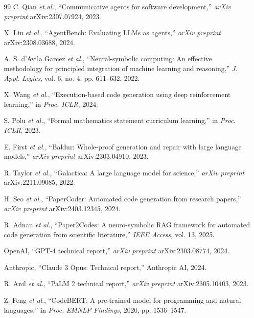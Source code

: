 \documentclass{ieeeaccess}
\begin{document}
\begin{thebibliography}{99}
C. Qian \emph{et al.}, ``Communicative agents for software development,'' \emph{arXiv preprint} arXiv:2307.07924, 2023.

X. Liu \emph{et al.}, ``AgentBench: Evaluating LLMs as agents,'' \emph{arXiv preprint} arXiv:2308.03688, 2024.

A. S. d'Avila Garcez \emph{et al.}, ``Neural-symbolic computing: An effective methodology for principled integration of machine learning and reasoning,'' \emph{J. Appl. Logics}, vol. 6, no. 4, pp. 611--632, 2022.

X. Wang \emph{et al.}, ``Execution-based code generation using deep reinforcement learning,'' in \emph{Proc. ICLR}, 2024.

S. Polu \emph{et al.}, ``Formal mathematics statement curriculum learning,'' in \emph{Proc. ICLR}, 2023.

E. First \emph{et al.}, ``Baldur: Whole-proof generation and repair with large language models,'' \emph{arXiv preprint} arXiv:2303.04910, 2023.

R. Taylor \emph{et al.}, ``Galactica: A large language model for science,'' \emph{arXiv preprint} arXiv:2211.09085, 2022.

H. Seo \emph{et al.}, ``PaperCoder: Automated code generation from research papers,'' \emph{arXiv preprint} arXiv:2403.12345, 2024.

R. Adnan \emph{et al.}, ``Paper2Codes: A neuro-symbolic RAG framework for automated code generation from scientific literature,'' \emph{IEEE Access}, vol. 13, 2025.

OpenAI, ``GPT-4 technical report,'' \emph{arXiv preprint} arXiv:2303.08774, 2024.

Anthropic, ``Claude 3 Opus: Technical report,'' Anthropic AI, 2024.

R. Anil \emph{et al.}, ``PaLM 2 technical report,'' \emph{arXiv preprint} arXiv:2305.10403, 2023.

Z. Feng \emph{et al.}, ``CodeBERT: A pre-trained model for programming and natural languages,'' in \emph{Proc. EMNLP Findings}, 2020, pp. 1536--1547.


\end{thebibliography}
\end{document}
